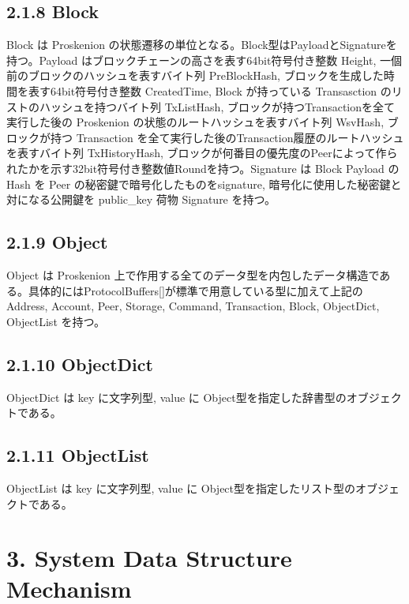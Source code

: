 \hypertarget{block}{%
\section{2.1.8 Block}\label{block}}

Block は Proskenion
の状態遷移の単位となる。Block型はPayloadとSignatureを持つ。Payload
はブロックチェーンの高さを表す64bit符号付き整数 Height,
一個前のブロックのハッシュを表すバイト列 PreBlockHash,
ブロックを生成した時間を表す64bit符号付き整数 CreatedTime, Block
が持っている Transasction のリストのハッシュを持つバイト列 TxListHash,
ブロックが持つTransactionを全て実行した後の Proskenion
の状態のルートハッシュを表すバイト列 WsvHash, ブロックが持つ Transaction
を全て実行した後のTransaction履歴のルートハッシュを表すバイト列
TxHistoryHash,
ブロックが何番目の優先度のPeerによって作られたかを示す32bit符号付き整数値Roundを持つ。Signature
は Block Payload の Hash を Peer の秘密鍵で暗号化したものをsignature,
暗号化に使用した秘密鍵と対になる公開鍵を public\_key 荷物 Signature
を持つ。

\hypertarget{object}{%
\section{2.1.9 Object}\label{object}}

Object は Proskenion
上で作用する全てのデータ型を内包したデータ構造である。具体的にはProtocolBuffers{[}{]}が標準で用意している型に加えて上記のAddress,
Account, Peer, Storage, Command, Transaction, Block, ObjectDict,
ObjectList を持つ。

\hypertarget{objectdict}{%
\section{2.1.10 ObjectDict}\label{objectdict}}

ObjectDict は key に文字列型, value に
Object型を指定した辞書型のオブジェクトである。

\hypertarget{objectlist}{%
\section{2.1.11 ObjectList}\label{objectlist}}

ObjectList は key に文字列型, value に
Object型を指定したリスト型のオブジェクトである。

\hypertarget{system-data-structure-mechanism}{%
\chapter{3. System Data Structure
Mechanism}\label{system-data-structure-mechanism}}

